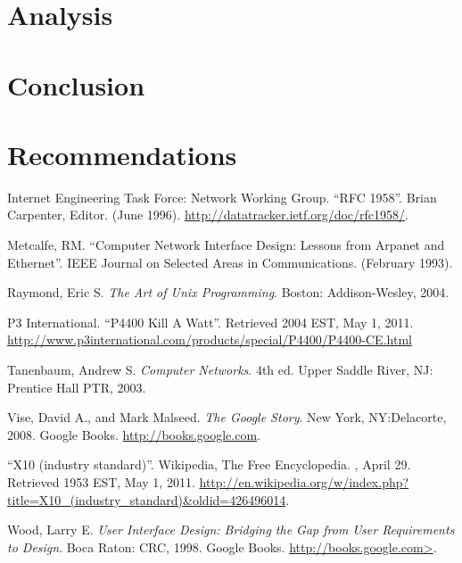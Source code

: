 \documentclass[12pt]{article}
\begin{document}
\section{Analysis}


\section{Conclusion}


\section{Recommendations}


\renewcommand{\refname}{\section{References}}
\begin{thebibliography}{10}

 Internet Engineering Task Force: Network Working Group.
  \newblock ``RFC 1958''.
  \newblock Brian Carpenter, Editor.
  \newblock (June 1996).
  \newblock \url{http://datatracker.ietf.org/doc/rfc1958/}.

 Metcalfe, RM.
  \newblock ``Computer Network Interface Design: Lessons from
  Arpanet and Ethernet''.
  \newblock IEEE Journal on Selected Areas in Communications.
  \newblock (February 1993).

 Raymond, Eric S.
  \newblock \emph{The Art of Unix Programming}.
  \newblock Boston: Addison-Wesley, 2004.

 P3 International.
  \newblock ``P4400 Kill A Watt''.
  \newblock Retrieved 2004 EST, May 1, 2011.
  \newblock \url{http://www.p3international.com/products/special/P4400/P4400-CE.html}

 Tanenbaum, Andrew S.
  \newblock \emph{Computer Networks}. 4th ed.
  \newblock Upper Saddle River, NJ: Prentice Hall PTR, 2003.

 Vise, David A., and Mark Malseed.
  \newblock \emph{The Google Story}.
  \newblock New York, NY:Delacorte, 2008.
  \newblock Google Books.
  \newblock \url{http://books.google.com}.

 ``X10 (industry standard)''.
  \newblock Wikipedia, The Free Encyclopedia.
  , April 29.  Retrieved 1953 EST, May 1, 2011.
  \newblock \url{http://en.wikipedia.org/w/index.php?title=X10_(industry_standard)&oldid=426496014}.

 Wood, Larry E.
  \newblock \emph{User Interface Design: Bridging the Gap from User
    Requirements to Design}.
  \newblock Boca Raton: CRC, 1998.
  \newblock Google Books.
  \newblock \url{http://books.google.com>}.

\end{thebibliography}
\end{document}
